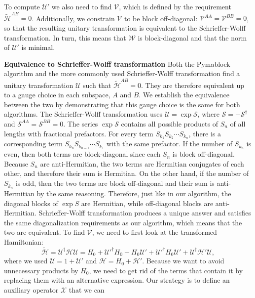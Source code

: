 To compute $\mathcal{U}'$ we also need to find $\mathcal{V}$, which is defined
by the requirement $\tilde{\mathcal{H}}^{AB} = 0$.
Additionally, we constrain $\mathcal{V}$ to be block off-diagonal:
$\mathcal{V}^{AA} = \mathcal{V}^{BB} = 0$,
so that the resulting unitary transformation is equivalent to the
Schrieffer-Wolff transformation.
In turn, this means that $\mathcal{W}$ is block-diagonal and that the norm
of $\mathcal{U}'$ is minimal.

\textbf{Equivalence to Schrieffer-Wolff transformation}
Both the Pymablock algorithm and the more commonly used Schrieffer-Wolff
transformation find a unitary transformation $\mathcal{U}$ such that
$\tilde{\mathcal{H}}^{AB}=0$.
They are therefore equivalent up to a gauge choice in each subspace, $A$ and
$B$.
We establish the equivalence between the two by demonstrating that this gauge
choice is the same for both algorithms.
%
The Schrieffer-Wolff transformation uses $\mathcal{U} = \exp \mathcal{S}$,
where $\mathcal{S} = -\mathcal{S}^\dagger$ and $\mathcal{S}^{AA} =
\mathcal{S}^{BB} = 0$.
%
The series $\exp\mathcal{S}$ contains all possible products of $S_n$ of all
lengths with fractional prefactors.
For every term $S_{k_1}S_{k_2}\cdots S_{k_n}$, there is a corresponding term
$S_{k_n}S_{k_{n-1}}\cdots S_{k_1}$ with the same prefactor.
If the number of $S_{k_n}$ is even, then both terms are block-diagonal since
each $S_n$ is block off-diagonal.
Because $S_n$ are anti-Hermitian, the two terms are Hermitian conjugates of each
other, and therefore their sum is Hermitian.
On the other hand, if the number of $S_{k_n}$ is odd, then the two terms are
block off-diagonal and their sum is anti-Hermitian by the same reasoning.
%
Therefore, just like in our algorithm, the diagonal blocks of $\exp S$ are
Hermitian, while off-diagonal blocks are anti-Hermitian.
Schrieffer-Wolff transformation produces a unique answer and satisfies the same
diagonalization requirements as our algorithm, which means that the two are
equivalent.
%
To find $\mathcal{V}$, we need to first look at the transformed Hamiltonian:
%
$$
\tilde{\mathcal{H}} = \mathcal{U}^\dagger \mathcal{H} \mathcal{U} = H_0 +
\mathcal{U}'^\dagger H_0 + H_0 \mathcal{U}' + \mathcal{U}'^\dagger H_0
\mathcal{U}' + \mathcal{U}^\dagger\mathcal{H'}\mathcal{U},
$$
where we used $\mathcal{U}=1+\mathcal{U}'$ and $\mathcal{H} = H_0 +
\mathcal{H'}$.
%
Because we want to avoid unnecessary products by $H_0$, we need to get rid of
the terms that contain it by replacing them with an alternative expression.
Our strategy is to define an auxiliary operator $\mathcal{X}$ that we can
